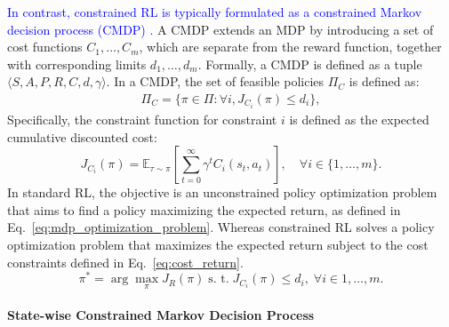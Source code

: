 \textcolor{blue}{In contrast, constrained RL is typically formulated as a constrained Markov decision process (CMDP) \cite{altman2021constrained}.}  %
A CMDP extends an MDP by introducing a set of cost functions $C_1, \ldots, C_m$, which are separate from the reward function, together with corresponding limits $d_1, \ldots, d_m$.
Formally, a CMDP is defined as a tuple $\langle S, A, P, R, C, d, \gamma \rangle$.
In a CMDP, the set of feasible policies $\Pi_C$ is defined as:
\begin{equation} \label{eq:feasible_policy_set_cmdp}
    \begin{aligned}
        \Pi_C = \{ \pi \in \Pi: \forall i, J_{C_i}(\pi) \leq d_i \},
    \end{aligned}
\end{equation}
Specifically, the constraint function for constraint $i$ is defined as the expected cumulative discounted cost:
\begin{equation} \label{eq:cost_return}
    J_{C_i}(\pi) = \mathbb{E}_{\tau \sim \pi}\!\left[\sum^\infty_{t = 0} \gamma^t C_i(s_t, a_t)\right], 
    \quad \forall i \in \{1, \ldots, m\}.
\end{equation}
In standard RL, the objective is an unconstrained policy optimization problem that aims to find a policy maximizing the expected return, as defined in Eq.~\eqref{eq:mdp_optimization_problem}.
Whereas constrained RL solves a policy optimization problem that maximizes the expected return subject to the cost constraints defined in Eq.~\eqref{eq:cost_return}.
\begin{equation} \label{eq:cmdp_optimization_problem}
    \pi^* = \arg\max_\pi J_R(\pi) \; \text{s. t.} \; J_{C_i}(\pi) \leq d_i, \; \forall i \in {1, \ldots, m}.
\end{equation}


\paragraph{State-wise Constrained Markov Decision Process}


